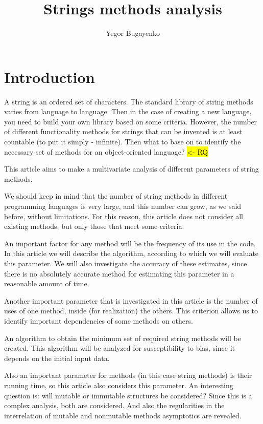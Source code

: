 \documentclass[anonymous,sigplan,review,11pt,nonacm,natbib=false]{acmart}
\title{Strings methods analysis}
\author{Yegor Bugayenko}
\affiliation{Huawei\city{Moscow}\country{Russia}}
\begin{document}
    \raggedbottom

    \begin{abstract}
    \end{abstract}

    \maketitle

    \section{Introduction}\label{sec:intro}

    A string is an ordered set of characters. The standard library of string methods varies from language to language. Then in the case of creating a new language, you need to build your own library based on some criteria. However, the number of different functionality methods for strings that can be invented is at least countable (to put it simply - infinite). Then what to base on to identify the necessary set of methods for an object-oriented language? \hl{<- RQ}

    This article aims to make a multivariate analysis of different parameters of string methods.

    We should keep in mind that the number of string methods in different programming languages is very large, and this number can grow, as we said before, without limitations. For this reason, this article does not consider all existing methods, but only those that meet some criteria.

    An important factor for any method will be the frequency of its use in the code. In this article we will describe the algorithm, according to which we will evaluate this parameter. We will also investigate the accuracy of these estimates, since there is no absolutely accurate method for estimating this parameter in a reasonable amount of time.

    Another important parameter that is investigated in this article is the number of uses of one method, inside (for realization) the others. This criterion allows us to identify important dependencies of some methods on others.

    An algorithm to obtain the minimum set of required string methods will be created. This algorithm will be analyzed for susceptibility to bias, since it depends on the initial input data.

    Also an important parameter for methods (in this case string methods) is their running time, so this article also considers this parameter. An interesting question is: will mutable or immutable structures be considered? Since this is a complex analysis, both are considered. And also the regularities in the interrelation of mutable and nonmutable methods asymptotics are revealed.
\end{document}
